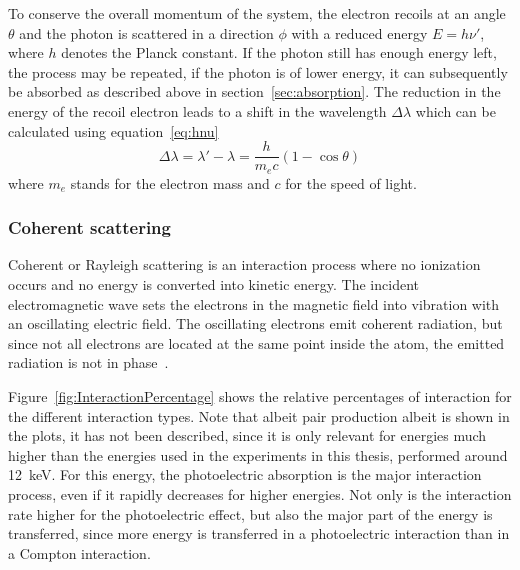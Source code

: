 To conserve the overall momentum of the system, the electron recoils at an angle $\theta$ and the photon is scattered in a direction $\phi$ with a reduced energy $E=h\nu'$, where $h$ denotes the Planck constant. If the photon still has enough energy left, the process may be repeated, if the photon is of lower energy, it can subsequently be absorbed as described above in section~\ref{sec:absorption}. The reduction in the energy of the recoil electron leads to a shift in the wavelength $\Delta\lambda$ which can be calculated using equation~\ref{eq:hnu}
\begin{equation}
	\Delta\lambda = \lambda' - \lambda = \frac{h}{m_e c}(1-\cos{\theta})
	\label{eq:hnu}
\end{equation}
where $m_e$ stands for the electron mass and $c$ for the speed of light.

\subsubsection{Coherent scattering}
Coherent or Rayleigh scattering is an interaction process where no ionization occurs and no energy is converted into kinetic energy. The incident electromagnetic wave sets the electrons in the magnetic field into vibration with an oscillating electric field. The oscillating electrons emit coherent radiation, but since not all electrons are located at the same point inside the atom, the emitted radiation is not in phase~\cite{Hsieh2003,Stampanoni2002}.

Figure~\ref{fig:InteractionPercentage} shows the relative percentages of interaction for the different interaction types. Note that albeit pair production albeit is shown in the plots, it has not been described, since it is only relevant for energies much higher than the energies used in the experiments in this thesis, performed around \SI{12}{\kilo\electronvolt}. For this energy, the photoelectric absorption is the major interaction process, even if it rapidly decreases for higher energies. Not only is the interaction rate higher for the photoelectric effect, but also the major part of the energy is transferred, since more energy is transferred in a photoelectric interaction than in a Compton interaction.

